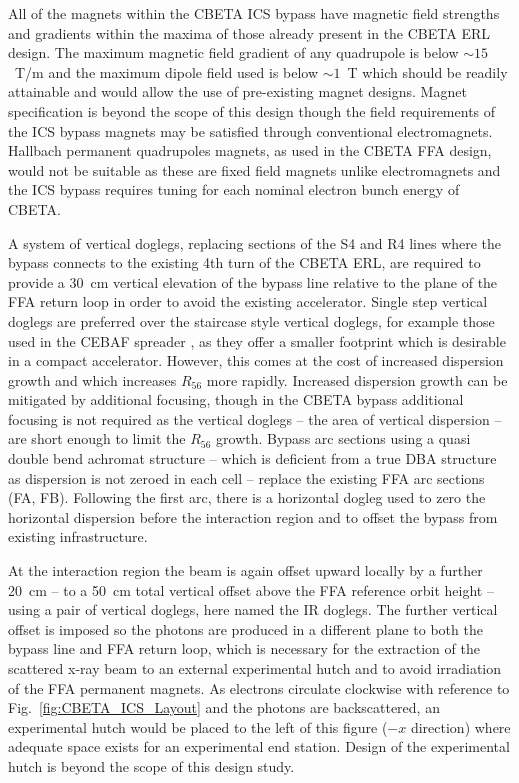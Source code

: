 \documentclass[../main.tex]{subfiles}
\begin{document}
All of the magnets within the CBETA ICS bypass have magnetic field strengths and gradients within the maxima of those already present in the CBETA ERL design. The maximum magnetic field gradient of any quadrupole is below $\sim15$~\si{\tesla}/\si{\meter} and the maximum dipole field used is below $\sim1$~\si{\tesla} which should be readily attainable and would allow the use of pre-existing magnet designs. Magnet specification is beyond the scope of this design though the field requirements of the ICS bypass magnets may be satisfied through conventional electromagnets. Hallbach permanent quadrupoles magnets, as used in the CBETA FFA design, would not be suitable as these are fixed field magnets unlike electromagnets and the ICS bypass requires tuning for each nominal electron bunch energy of CBETA. 

A system of vertical doglegs, replacing sections of the S4 and R4 lines where the bypass connects to the existing 4th turn of the CBETA ERL, are required to provide a 30~\si{\centi\meter} vertical elevation of the bypass line relative to the plane of the FFA return loop in order to avoid the existing accelerator. Single step vertical doglegs are preferred over the staircase style vertical doglegs, for example those used in the CEBAF spreader \cite{york1987optics}, as they offer a smaller footprint which is desirable in a compact accelerator. However, this comes at the cost of increased dispersion growth and which increases $R_{56}$ more rapidly. Increased dispersion growth can be mitigated by additional focusing, though in the CBETA bypass additional focusing is not required as the vertical doglegs -- the area of vertical dispersion -- are short enough to limit the $R_{56}$ growth. Bypass arc sections using a quasi double bend achromat structure -- which is deficient from a true DBA structure as dispersion is not zeroed in each cell -- replace the existing FFA arc sections (FA, FB). Following the first arc, there is a horizontal dogleg used to zero the horizontal dispersion before the interaction region and to offset the bypass from existing infrastructure. 

At the interaction region the beam is again offset upward locally by a further 20~\si{\centi\meter} -- to a 50~\si{\centi\meter} total vertical offset above the FFA reference orbit height -- using a pair of vertical doglegs, here named the IR doglegs. The further vertical offset is imposed so the photons are produced in a different plane to both the bypass line and FFA return loop, which is necessary for the extraction of the scattered x-ray beam to an external experimental hutch and to avoid irradiation of the FFA permanent magnets. As electrons circulate clockwise with reference to Fig.~\ref{fig:CBETA_ICS_Layout} and the photons are backscattered, an experimental hutch would be placed to the left of this figure ($-x$ direction) where adequate space exists for an experimental end station. Design of the experimental hutch is beyond the scope of this design study. 
\end{document}
